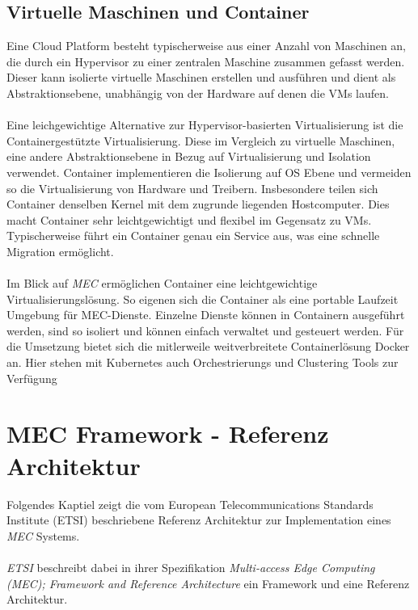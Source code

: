 \documentclass[runningheads]{llncs}
\numberwithin{figure}{section}
\begin{document}
\subsection{Virtuelle Maschinen und Container}
\label{subsec:Virtuelle Maschinen und Container}
Eine Cloud Platform besteht typischerweise aus einer Anzahl von Maschinen an, 
die durch ein Hypervisor zu einer zentralen Maschine zusammen gefasst werden.
Dieser kann isolierte virtuelle Maschinen erstellen und ausführen und dient als Abstraktionsebene, 
unabhängig von der Hardware auf denen die VMs laufen.
\\
\\
Eine leichgewichtige Alternative zur Hypervisor-basierten Virtualisierung ist die Containergestützte Virtualisierung. 
Diese im Vergleich zu virtuelle Maschinen, eine andere Abstraktionsebene in Bezug auf Virtualisierung und Isolation verwendet. 
Container implementieren die Isolierung auf OS Ebene und vermeiden so die Virtualisierung von Hardware und Treibern. 
Insbesondere teilen sich Container denselben Kernel mit dem zugrunde liegenden Hostcomputer. 
Dies macht Container sehr leichtgewichtigt und flexibel im 
Gegensatz zu VMs. Typischerweise führt ein Container genau ein Service aus, was eine schnelle Migration ermöglicht.
\\
\\
Im Blick auf \textit{MEC} ermöglichen Container eine leichtgewichtige Virtualisierungslösung. So eigenen sich die Container
als eine portable Laufzeit Umgebung für MEC-Dienste. 
Einzelne Dienste können in Containern ausgeführt werden, sind so isoliert und können einfach 
verwaltet und gesteuert werden. Für die Umsetzung bietet sich die mitlerweile weitverbreitete Containerlösung Docker an. Hier stehen mit 
Kubernetes auch Orchestrierungs und Clustering Tools zur Verfügung  \cite{morabitoConsolidateIoTEdge2018}

\section{MEC Framework - Referenz Architektur}
\label{subsec:MEC Framework - Referenz Architektur}
Folgendes Kaptiel zeigt die vom European Telecommunications Standards Institute (ETSI) beschriebene
Referenz Architektur zur Implementation eines \textit{MEC} Systems. 
\\ 
\\
\textit{ETSI} beschreibt dabei in ihrer Spezifikation \textit{Multi-access Edge Computing (MEC); 
Framework and Reference Architecture} \cite{etsiETSIGSMEC} ein Framework und eine 
Referenz Architektur.
\end{document}

